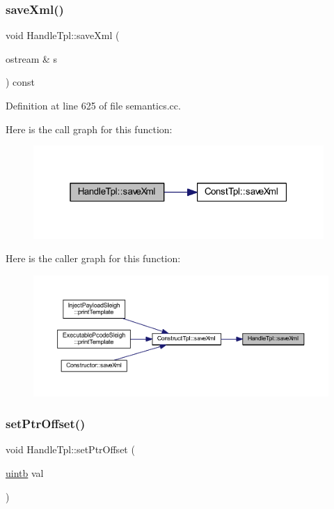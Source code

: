 \subsubsection{\texorpdfstring{saveXml()}{saveXml()}}
{\footnotesize\ttfamily void Handle\+Tpl\+::save\+Xml (\begin{DoxyParamCaption}\item[{ostream \&}]{s }\end{DoxyParamCaption}) const}



Definition at line 625 of file semantics.\+cc.

Here is the call graph for this function\+:
\nopagebreak
\begin{figure}[H]
\begin{center}
\leavevmode
\includegraphics[width=313pt]{class_handle_tpl_aee0b4e635198cb82374e925c6b7c9475_cgraph}
\end{center}
\end{figure}
Here is the caller graph for this function\+:
\nopagebreak
\begin{figure}[H]
\begin{center}
\leavevmode
\includegraphics[width=350pt]{class_handle_tpl_aee0b4e635198cb82374e925c6b7c9475_icgraph}
\end{center}
\end{figure}
\mbox{\label{class_handle_tpl_a6771a49d39c41a4ca2e1eabba1a1b28a}} 
\subsubsection{\texorpdfstring{setPtrOffset()}{setPtrOffset()}}
{\footnotesize\ttfamily void Handle\+Tpl\+::set\+Ptr\+Offset (\begin{DoxyParamCaption}\item[{\mbox{\hyperlink{types_8h_a2db313c5d32a12b01d26ac9b3bca178f}{uintb}}}]{val }\end{DoxyParamCaption})\hspace{0.3cm}{\ttfamily [inline]}}



